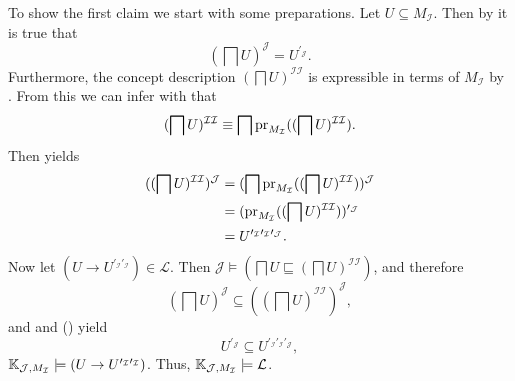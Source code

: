 \begin{Proof}
  To show the first claim we start with some preparations.  Let $U \subseteq
  M_{\mathcal{I}}$.  Then by  it is true that
  \begin{equation}
    \label{eq:29}
    (\bigsqcap U)^{\mathcal{J}} = U^{\prime_{\mathcal{J}}}.
  \end{equation}
  Furthermore, the concept description $(\bigsqcap U)^{\mathcal{I}\mathcal{I}}$ is
  expressible in terms of $M_{\mathcal{I}}$ by
  .  From this we can infer with
   that
  \begin{equation*}
    (\bigsqcap U)^{\mathcal{I}\mathcal{I}} \equiv \bigsqcap
    \operatorname{pr}_{M_{\mathcal{I}}}((\bigsqcap U)^{\mathcal{I}\mathcal{I}}).
  \end{equation*}
  Then  yields
  \begin{equation}
    \label{eq:30}
    \begin{aligned}
      ((\bigsqcap U)^{\mathcal{I}\mathcal{I}})^{\mathcal{J}}
      &= (\bigsqcap \operatorname{pr}_{M_{\mathcal{I}}}((\bigsqcap
      U)^{\mathcal{I}\mathcal{I}}))^{\mathcal{J}} \\
      &= (\operatorname{pr}_{M_{\mathcal{I}}}((\bigsqcap
      U)^{\mathcal{I}\mathcal{I}}))^{\prime_{\mathcal{J}}} \\
      &= U^{\prime_{\mathcal{I}}\prime_{\mathcal{I}}\prime_{\mathcal{J}}}.
    \end{aligned}
  \end{equation}
  Now let $(U \to U^{\prime_{\mathcal{I}}\prime_{\mathcal{I}}}) \in \mathcal{L}$.  Then
  $\mathcal{J} \models (\bigsqcap U \sqsubseteq (\bigsqcap U)^{\mathcal{I}\mathcal{I}})$,
  and therefore
  \begin{equation*}
    (\bigsqcap U)^{\mathcal{J}} \subseteq ((\bigsqcap U)^{\mathcal{I}\mathcal{I}})^{\mathcal{J}},
  \end{equation*}
  and  and () yield
  \begin{equation*}
    U^{\prime_{\mathcal{J}}} \subseteq U^{\prime_{\mathcal{I}}\prime_{\mathcal{I}}\prime_{\mathcal{J}}},
  \end{equation*}
  \ie ${\mathbb{K}}_{\mathcal{J}, M_{\mathcal{I}}} \models (U \to
  U^{\prime_{\mathcal{I}}\prime_{\mathcal{I}}})$.  Thus, ${\mathbb{K}}_{\mathcal{J},
    M_{\mathcal{I}}} \models \mathcal{L}$.


\end{Proof}
